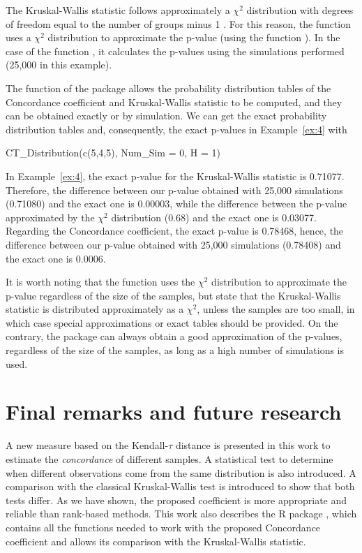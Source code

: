 The Kruskal-Wallis statistic follows approximately a $\chi^2$ distribution with degrees of freedom equal to the number of groups minus 1 \citep{Kruskal1952}. For this reason, the function  uses a $\chi^2$ distribution to approximate the p-value (using the function ). In the case of the function , it calculates the p-values using the simulations performed (25,000 in this example).

The function  of the  package allows the probability distribution tables of the Concordance coefficient and Kruskal-Wallis statistic to be computed, and they can be obtained exactly or by simulation. We can get the exact probability distribution tables and, consequently, the exact p-values in Example~\ref{ex:4} with
\begin{example}
CT_Distribution(c(5,4,5), Num_Sim = 0, H = 1)
\end{example}

In Example~\ref{ex:4}, the exact p-value for the Kruskal-Wallis statistic is 0.71077. Therefore, the difference between our p-value obtained with 25,000 simulations (0.71080) and the exact one is 0.00003, while the difference between the p-value approximated by the $\chi^2$ distribution (0.68) and the exact one is 0.03077. Regarding the Concordance coefficient, the exact p-value is 0.78468, hence, the difference between our p-value obtained with 25,000 simulations (0.78408) and the exact one is 0.0006.

It is worth noting that the function  uses the $\chi^2$ distribution to approximate the p-value regardless of the size of the samples, but \cite{Kruskal1952} state that the Kruskal-Wallis statistic is distributed approximately as a $\chi^2$, unless the samples are too small, in which case special approximations or exact tables should be provided. On the contrary, the  package can always obtain a good approximation of the p-values, regardless of the size of the samples, as long as a high number of simulations is used.


\section{Final remarks and future research} \label{sec:conclusion}

A new measure based on the Kendall-$\tau$ distance is presented in this work to estimate the \emph{concordance} of different samples. A statistical test to determine when different observations come from the same distribution is also introduced. A comparison with the classical Kruskal-Wallis test is introduced to show that both tests differ. As we have shown, the proposed coefficient is more appropriate and reliable than rank-based methods. This work also describes the R package  \citep{ConcordanceTest2022}, which contains all the functions needed to work with the proposed Concordance coefficient and allows its comparison with the Kruskal-Wallis statistic.

